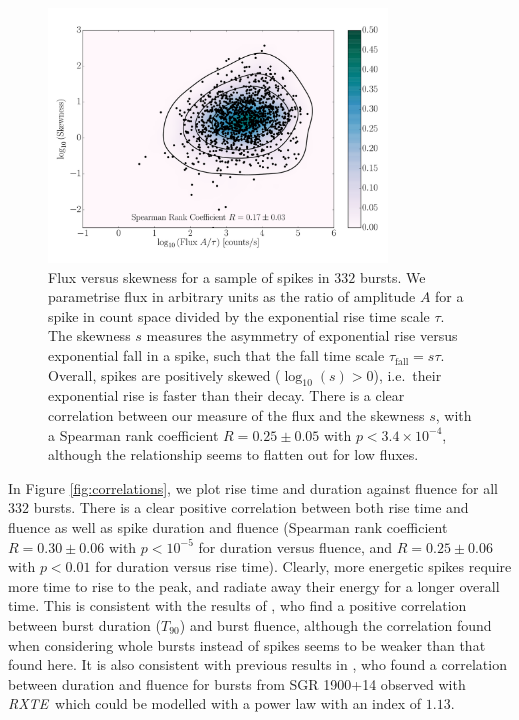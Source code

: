 \documentclass[12pt]{emulateapj}
\newcommand{\project}[1]{\textsl{#1}}
\newcommand{\rxte}{\project{RXTE}}
\begin{document}
\begin{figure}[htbp]
\begin{center}
\includegraphics[width=9cm]{ch6f8.pdf}%
\caption{Flux versus skewness for a sample of spikes in $332$ bursts. We parametrise flux in arbitrary units as the ratio of amplitude $A$ 
for a spike in count space divided by the exponential rise time scale $\tau$. The skewness $s$ measures the asymmetry
of exponential rise versus exponential fall in a spike, such that the fall time scale $\tau_{\mathrm{fall}} = s\tau$. Overall, spikes are positively skewed ($\log_{10}{(s)} > 0$), i.e.\ their
exponential rise is faster than their decay. There is a clear correlation between our measure of the flux and the skewness $s$, with a Spearman rank coefficient $R = 0.25 \pm 0.05$ with $p < 3.4 \times 10^{-4}$, although the relationship seems to flatten out for low fluxes.}
\label{fig:skewness}
\end{center}
\end{figure}


In Figure \ref{fig:correlations}, we plot rise time and duration against fluence for all $332$ bursts. There is a clear positive
correlation between both rise time and fluence as well as spike duration and fluence (Spearman rank coefficient $R = 0.30\pm0.06$ with $p < 10^{-5}$ for duration versus fluence,
and $R = 0.25\pm0.06$ with $p < 0.01$ for duration versus rise time). Clearly, more energetic spikes require more time to rise to the peak,
and radiate away their energy for a longer overall time. This is consistent with the results of \citet{vanderhorst2012}, who find a positive correlation between burst duration ($T_{90}$)
and burst fluence, although the correlation found when considering whole bursts instead of spikes seems to be weaker than that found here. It is also consistent with 
previous results in \citet{gogus1999}, who found a correlation between
duration and fluence for bursts from SGR 1900+14 observed with \rxte\, which could be modelled with a power law with an index of $1.13$. 
\end{document}
